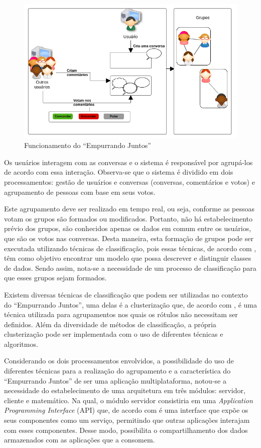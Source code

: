 \begin{figure}[h!]
\centering
\includegraphics[scale=0.6]{figuras/resumo_ej.png}
\caption{Funcionamento do ``Empurrando Juntos''}
\label{fig:resumo_ej}
\end{figure}

Os usuários interagem com as conversas e o sistema é responsável por agrupá-los de acordo com essa interação.
Observa-se que o sistema é dividido em dois processamentos: gestão de usuários 
e conversas (conversas, comentários e votos) e agrupamento de pessoas com base em seus votos. 

Este agrupamento deve ser realizado em tempo real, ou seja, conforme as pessoas votam os grupos são formados ou modificados. 
Portanto, não há estabelecimento prévio dos grupos, são conhecidos apenas os dados em comum entre os usuários, que são os votos nas conversas. 
Desta maneira, esta formação de grupos pode ser executada utilizando técnicas de classificação,
pois essas técnicas, de acordo com  , 
têm como objetivo encontrar um modelo que possa descrever e distinguir classes de dados.
Sendo assim, nota-se a necessidade de um processo de classificação para que esses grupos sejam formados. 

Existem diversas técnicas de classificação que podem ser utilizadas no contexto do ``Empurrando Juntos'', uma delas é a
clusterização que, de acordo com , é uma técnica utilizada para agrupamentos 
nos quais os rótulos não necessitam ser definidos. Além da diversidade de métodos de classificação, a própria clusterização pode ser implementada com o uso de 
diferentes técnicas e algoritmos. 

Considerando os dois processamentos envolvidos, a possibilidade do uso de diferentes técnicas para a 
realização do agrupamento e a característica do ``Empurrando Juntos'' de ser uma aplicação multiplataforma, notou-se
a necessidade do estabelecimento de uma arquitetura em três módulos: servidor, cliente e matemático. Na qual, o módulo servidor 
consistiria em uma \textit{Application Programming Interface} (API) que, de acordo com 
é uma interface que expõe os seus componentes como um serviço, permitindo que outras aplicações interajam com esses 
componentes. Desse modo, possibilita o compartilhamento dos dados armazenados com as aplicações que a consomem.


